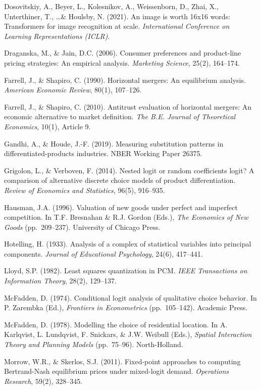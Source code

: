 Dosovitskiy, A., Beyer, L., Kolesnikov, A., Weissenborn, D., Zhai, X.,
Unterthiner, T., \ldots \& Houlsby, N. (2021). An image is worth 16x16
words: Transformers for image recognition at scale. \emph{International
Conference on Learning Representations (ICLR)}.

Draganska, M., \& Jain, D.C. (2006). Consumer preferences and
product-line pricing strategies: An empirical analysis. \emph{Marketing
Science}, 25(2), 164--174.

Farrell, J., \& Shapiro, C. (1990). Horizontal mergers: An equilibrium
analysis. \emph{American Economic Review}, 80(1), 107--126.

Farrell, J., \& Shapiro, C. (2010). Antitrust evaluation of horizontal
mergers: An economic alternative to market definition. \emph{The B.E.
Journal of Theoretical Economics}, 10(1), Article 9.

Gandhi, A., \& Houde, J.-F. (2019). Measuring substitution patterns in
differentiated-products industries. NBER Working Paper 26375.

Grigolon, L., \& Verboven, F. (2014). Nested logit or random
coefficients logit? A comparison of alternative discrete choice models
of product differentiation. \emph{Review of Economics and Statistics},
96(5), 916--935.

Hausman, J.A. (1996). Valuation of new goods under perfect and imperfect
competition. In T.F. Bresnahan \& R.J. Gordon (Eds.), \emph{The
Economics of New Goods} (pp.~209--237). University of Chicago Press.

Hotelling, H. (1933). Analysis of a complex of statistical variables
into principal components. \emph{Journal of Educational Psychology},
24(6), 417--441.

Lloyd, S.P. (1982). Least squares quantization in PCM. \emph{IEEE
Transactions on Information Theory}, 28(2), 129--137.

McFadden, D. (1974). Conditional logit analysis of qualitative choice
behavior. In P. Zarembka (Ed.), \emph{Frontiers in Econometrics}
(pp.~105--142). Academic Press.

McFadden, D. (1978). Modelling the choice of residential location. In A.
Karlqvist, L. Lundqvist, F. Snickars, \& J.W. Weibull (Eds.),
\emph{Spatial Interaction Theory and Planning Models} (pp.~75--96).
North-Holland.

Morrow, W.R., \& Skerlos, S.J. (2011). Fixed-point approaches to
computing Bertrand-Nash equilibrium prices under mixed-logit demand.
\emph{Operations Research}, 59(2), 328--345.

